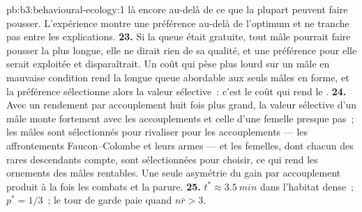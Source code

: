 \begin{solution}{pb:b3:behavioural-ecology:1}
là encore au-delà de ce que la plupart peuvent faire pousser.
L'expérience montre une préférence au-delà de l'optimum et ne tranche
pas entre les explications.
\textbf{23.} Si la queue était gratuite, tout mâle pourrait faire
pousser la plus longue, elle ne dirait rien de sa qualité, et une
préférence pour elle serait exploitée et disparaîtrait. Un coût qui pèse
plus lourd sur un mâle en mauvaise condition rend la longue queue
abordable aux seuls mâles en forme, et la préférence sélectionne alors
la valeur sélective~: c'est le coût qui rend le .
\textbf{24.} Avec un rendement par accouplement huit fois plus grand, la
valeur sélective d'un mâle monte fortement avec les accouplements et
celle d'une femelle presque pas~; les mâles sont sélectionnés pour
rivaliser pour les accouplements --- les affrontements Faucon--Colombe
et leurs armes --- et les femelles, dont chacun des rares descendants
compte, sont sélectionnées pour choisir, ce qui rend les ornements des
mâles rentables. Une seule asymétrie du gain par accouplement produit à
la fois les combats et la parure.
\textbf{25.} $t^{*} \approx \qty{3.5}{min}$ dans l'habitat dense~; $p^{*}
= 1/3$~; le tour de garde paie quand $n\bar r > 3$.
\end{solution}
